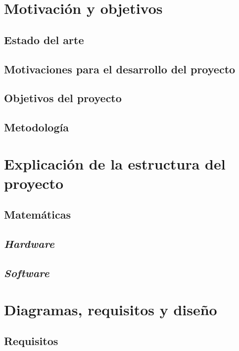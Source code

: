 \chapter{Motivación y objetivos}

\section{Estado del arte}

\section{Motivaciones para el desarrollo del proyecto}

\section{Objetivos del proyecto}

\section{Metodología}


\chapter{Explicación de la estructura del proyecto}

\section{Matemáticas}

\section{\textit{Hardware}}

\section{\textit{Software}}


\chapter{Diagramas, requisitos y diseño}

\section{Requisitos}

